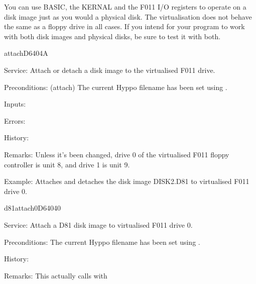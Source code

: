 You can use BASIC, the KERNAL and the F011 I/O registers to operate on a disk
image just as you would a physical disk. The virtualisation does not behave the
same as a floppy drive in all cases. If you intend for your program to work
with both disk images and physical disks, be sure to test it with both.

\newpage
\begin{hyppotrap}{attach}{D640}{4A}
\item [Service:]
  Attach or detach a disk image to the virtualised F011 drive.
\item [Preconditions:]
  (attach) The current Hyppo filename has been set using .
\item [Inputs:]
\item [Errors:]
\item [History:]
\item [Remarks:]
  Unless it's been changed, drive 0 of the virtualised F011 floppy controller is
  unit 8, and drive 1 is unit 9.
\item [Example:]
  Attaches and detaches the disk image DISK2.D81 to virtualised F011 drive 0.
\end{hyppotrap}


\begin{hyppotrap}{d81attach0}{D640}{40}
\item [Service:]
  Attach a D81 disk image to virtualised F011 drive 0.
\item [Preconditions:]
  The current Hyppo filename has been set using .
\item [History:]
  \\
\item [Remarks:]
  This actually calls  with 
\end{hyppotrap}


